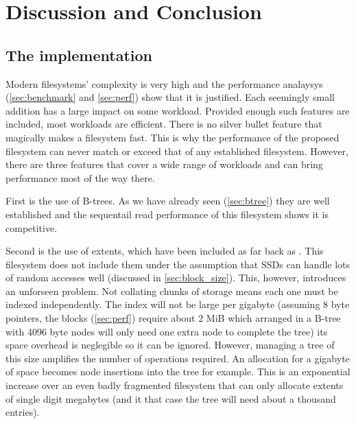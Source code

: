 \chapter{Discussion and Conclusion}

    \section{The implementation}
        \label{sec:implementation_discussion}

        Modern filesystems' complexity is very high and the performance
        analaysys (\autoref{sec:benchmark} and \autoref{sec:perf}) show that it is
        justified. Each seemingly small addition has a large impact on some
        workload. Provided enough such features are included, most workloads
        are efficient. There is no silver bullet feature that magically makes a
        filesystem fast. This is why the performance of the proposed filesystem
        can never match or exceed that of any established filesystem. However,
        there are three features that cover a wide range of workloads and can
        bring performance most of the way there.

        First is the use of B-trees. As we have already seen (\autoref{sec:btree})
        they are well established and the sequentail read performance of this
        filesystem shows it is competitive.

        Second is the use of extents, which have been included as far back as
        \citeyear{LFS}. This filesystem does not include them under the
        assumption that SSDs can handle lots of random accesses well (discussed
        in \autoref{sec:block_size}). This, however, introduces an unforseen
        problem. Not collating chunks of storage means each one must be indexed
        independently. The index will not be large per gigabyte (assuming 8
        byte pointers, the  blocks (\autoref{sec:perf}) require
        about 2 MiB which arranged in a B-tree with 4096 byte nodes will only
        need one extra node to complete the tree) its space overhead is
        neglegible so it can be ignored. However, managing a tree of this size
        amplifies the number of operations required. An allocation for a
        gigabyte of space becomes  node insertions into the
        tree for example. This is an exponential increase over an even badly
        fragmented filesystem that can only allocate extents of single digit
        megabytes (and it that case the tree will need about a thousand
        entries).

